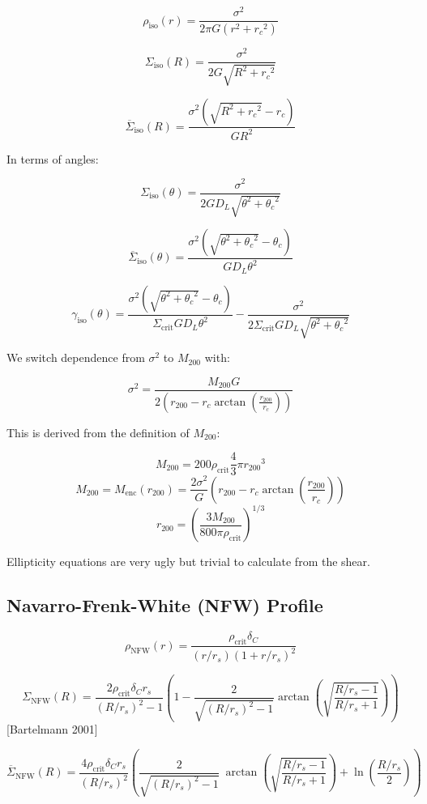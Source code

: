 \documentclass[]{article}
\begin{document}
\[\rho_\mathrm{iso}(r) = \frac{\sigma^2}{2\pi G (r^2 + {r_c}^2)}\]

\[\Sigma_\mathrm{iso}(R) = \frac{\sigma^2}{2 G \sqrt{R^2 + {r_c}^2}}\]

\[\overline{\Sigma}_\mathrm{iso}(R) = \frac{\sigma^2 \left(\sqrt{R^2 + {r_c}^2} - r_c \right)}{G R^2}\]

In terms of angles:

\[\Sigma_\mathrm{iso}(\theta) = \frac{\sigma^2}{2 G D_L \sqrt{\theta^2 + {\theta_c}^2}}\]

\[\overline{\Sigma}_\mathrm{iso}(\theta) = \frac{\sigma^2 \left(\sqrt{\theta^2 + {\theta_c}^2} - \theta_c \right)}{G D_L \theta^2}\]

\[\gamma_\mathrm{iso}(\theta) = \frac{\sigma^2 \left(\sqrt{\theta^2 + {\theta_c}^2} - \theta_c \right)}{\Sigma_\mathrm{crit} G D_L \theta^2} - \frac{\sigma^2}{2 \Sigma_\mathrm{crit} G D_L \sqrt{\theta^2 + {\theta_c}^2}}\]

We switch dependence from $\sigma^2$ to $M_{200}$ with:

\[\sigma^2 = \frac{M_{200} G}{2 \left( r_{200} - r_c \arctan{\left(\frac{r_{200}}{r_c}\right)} \right)}\]

This is derived from the definition of $M_{200}$:

\[M_{200} = 200 \rho_\mathrm{crit} \frac{4}{3} \pi {r_{200}}^3\]
\[M_{200} = M_\mathrm{enc}(r_{200}) = \frac{2 \sigma^2}{G} \left( r_{200} - r_c \arctan{\left(\frac{r_{200}}{r_c}\right)} \right)\]
\[r_{200} = \left( \frac{3 M_{200}}{800 \pi \rho_\mathrm{crit}} \right)^{1/3}\]

Ellipticity equations are very ugly but trivial to calculate from the shear.



\subsection{Navarro-Frenk-White (NFW) Profile}

\[\rho_\mathrm{NFW}(r) = \frac{\rho_\mathrm{crit} \delta_C}{(r/r_s)\left(1 + r/r_s\right)^2}\]

\[\Sigma_\mathrm{NFW}(R) = \frac{2 \rho_\mathrm{crit} \delta_C r_s}{(R/r_s)^2 - 1} \left(1 - \frac{2}{\sqrt{(R/r_s)^2 - 1}}  \arctan\left(\sqrt{\frac{R/r_s - 1}{R/r_s + 1}} \right) \right)\]
[Bartelmann 2001]

\[\overline{\Sigma}_\mathrm{NFW}(R) = \frac{4 \rho_\mathrm{crit} \delta_C r_s}{(R/r_s)^2} \left(
    \frac{2}{\sqrt{(R/r_s)^2 - 1}} ~\arctan\left(\sqrt{\frac{R/r_s - 1}{R/r_s + 1}} \right) + \ln{\left(\frac{R/r_s}{2}\right)}
\right)\]
\end{document}
